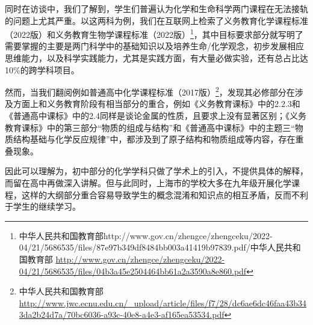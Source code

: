 \documentclass[12pt,UTF8]{ctexart}
\begin{document}
\par{同时在访谈中，我们了解到，学生们普遍认为化学和生命科学两门课程在无法接轨的问题上尤其严重。以这两科为例，我们在互联网上检索了义务教育化学课程标准（2022版）和义务教育生物学课程标准（2022版）\footnote{中华人民共和国教育部http://www.gov.cn/zhengce/zhengceku/2022-04/21/5686535/files/87e97b349df8484bb003a41419b97839.pdf/中华人民共和国教育部
		\url{http://www.gov.cn/zhengce/zhengceku/2022-04/21/5686535/files/04b3a45e2504464bb61a2a3590a8e860.pdf}}，其中目标要求部分就写明了需要掌握的主要是两门科学中的基础知识以及培养生命/化学观念，初步发展相应思维能力，以及科学实践能力，尤其是实践方面，有大量必做实验，还有总占比达10\%的跨学科项目。}

\par{然而，当我们翻阅例如普通高中化学课程标准（2017版）\footnote{中华人民共和国教育部
		\url{http://www.jwc.ecnu.edu.cn/_upload/article/files/f7/28/dc6ae6dc46faa43b343da2b24d7a/70bc6036-a93c-40e8-a4e3-af165ea53534.pdf}}，发现其必修部分在涉及方面上和义务教育阶段有相当部分的重合，例如《义务教育课标》中的2.2.3和《普通高中课标》中的2.4同样是谈论金属的性质，且要求上没有显著区别；《义务教育课标》中的第三部分“物质的组成与结构”和《普通高中课标》中的主题三“物质结构基础与化学反应规律”中，都涉及到了原子结构和物质组成等内容，存在重叠现象。}

\par{因此可以理解为，初中部分的化学学科只做了学术上的引入，不提供具体的解释，而留在高中再做深入讲解。但与此同时，上海市的学校大多在九年级开展化学课程，这样的大纲部分重合容易导致学生的概念混淆和知识点的相互矛盾，反而不利于学生的继续学习。}
\end{document}
